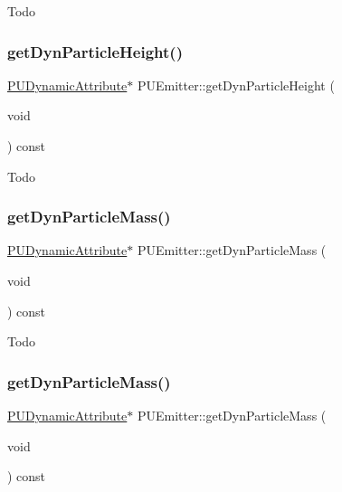 Todo \mbox{\label{classPUEmitter_af66312c994c7405a9ccda00544010d3a}} 
\subsubsection{\texorpdfstring{get\+Dyn\+Particle\+Height()}{getDynParticleHeight()}\hspace{0.1cm}{\footnotesize\ttfamily [2/2]}}
{\footnotesize\ttfamily \hyperlink{classPUDynamicAttribute}{P\+U\+Dynamic\+Attribute}$\ast$ P\+U\+Emitter\+::get\+Dyn\+Particle\+Height (\begin{DoxyParamCaption}\item[{void}]{ }\end{DoxyParamCaption}) const\hspace{0.3cm}{\ttfamily [inline]}}

Todo \mbox{\label{classPUEmitter_a9c80a35323f067e941f51e5dd1d0bb31}} 
\subsubsection{\texorpdfstring{get\+Dyn\+Particle\+Mass()}{getDynParticleMass()}\hspace{0.1cm}{\footnotesize\ttfamily [1/2]}}
{\footnotesize\ttfamily \hyperlink{classPUDynamicAttribute}{P\+U\+Dynamic\+Attribute}$\ast$ P\+U\+Emitter\+::get\+Dyn\+Particle\+Mass (\begin{DoxyParamCaption}\item[{void}]{ }\end{DoxyParamCaption}) const\hspace{0.3cm}{\ttfamily [inline]}}

Todo \mbox{\label{classPUEmitter_a2ed7a7c4403e98d58f5770dbc2f9db35}} 
\subsubsection{\texorpdfstring{get\+Dyn\+Particle\+Mass()}{getDynParticleMass()}\hspace{0.1cm}{\footnotesize\ttfamily [2/2]}}
{\footnotesize\ttfamily \hyperlink{classPUDynamicAttribute}{P\+U\+Dynamic\+Attribute}$\ast$ P\+U\+Emitter\+::get\+Dyn\+Particle\+Mass (\begin{DoxyParamCaption}\item[{void}]{ }\end{DoxyParamCaption}) const\hspace{0.3cm}{\ttfamily [inline]}}

